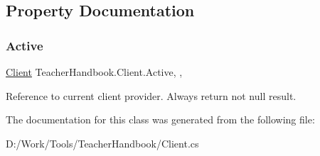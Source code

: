 \subsection{Property Documentation}
\mbox{\label{class_teacher_handbook_1_1_client_a403583a80a8d5040410c4f1f180aafad}} 
\subsubsection{\texorpdfstring{Active}{Active}}
{\footnotesize\ttfamily \mbox{\hyperlink{class_teacher_handbook_1_1_client}{Client}} Teacher\+Handbook.\+Client.\+Active\hspace{0.3cm}{\ttfamily [static]}, {\ttfamily [get]}, {}}



Reference to current client provider. Always return not null result. 



The documentation for this class was generated from the following file\+:\begin{DoxyCompactItemize}
\item 
D\+:/\+Work/\+Tools/\+Teacher\+Handbook/Client.\+cs\end{DoxyCompactItemize}
